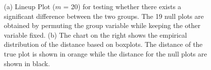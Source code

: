 \documentclass[12]{article}
\begin{document}
\begin{figure}[hbtp]
\centering
{}
\label{dist2}
	\vspace{-.1in}
\caption[Optional caption for list of figures]{(a) Lineup Plot ($m$ = 20) for testing whether there exists a significant difference between the two groups. The 19 null plots are obtained by permuting the group variable while keeping the other variable fixed.  (b) The chart on the right shows the empirical distribution of the distance based on boxplots. The distance of the true plot is shown in orange while the distance for the null plots are shown in black. }
\end{figure}
\end{document}

